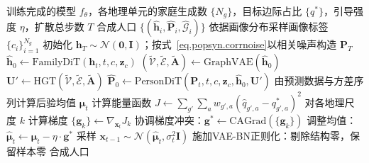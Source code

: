\begin{algorithm}[H]
\caption{引入能量引导与VAE-BN正则化的HiDiT采样流程}\label{alg.popsyn.sampling}
\begin{algorithmic}[1]
\REQUIRE 训练完成的模型 $f_\theta$，各地理单元的家庭生成数 $\{N_g\}$，目标边际占比 $\{q^*\}$，引导强度 $\eta$，扩散总步数 $T$
\ENSURE 合成人口 $\{(\hat{\mathbf{h}}_i, \hat{\mathbf{P}}_i, \hat{\mathcal{G}}_i)\}$
  \STATE 依据画像分布采样画像标签 $\{c_i\}_{i=1}^{N_g}$
  \STATE 初始化 $\mathbf{h}_T \sim \mathcal{N}(\mathbf{0}, \mathbf{I})$；按式~\eqref{eq.popsyn.corrnoise}以相关噪声构造 $\mathbf{P}_T$
    \STATE $\hat{\mathbf{h}}_0 \leftarrow \text{FamilyDiT}(\mathbf{h}_t, t, c, \mathbf{z}_c)$
    \STATE $(\tilde{\mathcal{V}}, \tilde{\mathcal{E}}, \tilde{\mathbf{A}}) \leftarrow \text{GraphVAE}(\hat{\mathbf{h}}_0)$
    \STATE $\mathbf{U}' \leftarrow \text{HGT}(\tilde{\mathcal{V}}, \tilde{\mathcal{E}}, \tilde{\mathbf{A}})$
    \STATE $\hat{\mathbf{P}}_0 \leftarrow \text{PersonDiT}(\mathbf{P}_t, t, c, \mathbf{z}_c, \hat{\mathbf{h}}_0, \mathbf{U}')$
    \STATE 由预测数据与方差序列计算后验均值 $\boldsymbol{\mu}_t$
    \STATE 计算能量函数 $J \leftarrow \sum_{g'} \sum_{a} w_{g', a} (\hat{q}_{g', a} - q_{g', a}^*)^2$
    \STATE 对各地理尺度 $k$ 计算梯度 $\{\mathbf{g}_k\} \leftarrow \nabla_{\mathbf{x}_t} J_k$
    \STATE 协调梯度冲突：$\mathbf{g}^{*} \leftarrow \text{CAGrad}(\{\mathbf{g}_k\})$
    \STATE 调整均值：$\hat{\boldsymbol{\mu}}_t \leftarrow \boldsymbol{\mu}_t - \eta \cdot \mathbf{g}^{*}$
    \STATE 采样 $\mathbf{x}_{t-1} \sim \mathcal{N}(\hat{\boldsymbol{\mu}}_t, \sigma_t^2 \mathbf{I})$
  \ENDFOR
  \STATE 施加VAE-BN正则化：剔除结构零，保留样本零
\ENDFOR
\RETURN 合成人口
\end{algorithmic}
\end{algorithm}

\indent
{}